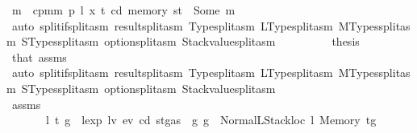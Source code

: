 \begin{isabellebody}
\ m\ \ {\isachardoublequoteopen}cpm{}m\ p\ l\ x\ t\ cd\ {\isacharparenleft}{\kern0pt}memory\ st{\isacharparenright}{\kern0pt}\ {\isacharequal}{\kern0pt}\ Some\ m{\isachardoublequoteclose}\isanewline
\ \ \ \ \ \ \ \ \isamarkupfalse%
\ {\isacharparenleft}{\kern0pt}auto\ split{\isacharcolon}{\kern0pt}if{\isacharunderscore}{\kern0pt}split{\isacharunderscore}{\kern0pt}asm\ result{\isachardot}{\kern0pt}split{\isacharunderscore}{\kern0pt}asm\ Type{\isachardot}{\kern0pt}split{\isacharunderscore}{\kern0pt}asm\ LType{\isachardot}{\kern0pt}split{\isacharunderscore}{\kern0pt}asm\ MTypes{\isachardot}{\kern0pt}split{\isacharunderscore}{\kern0pt}asm\ STypes{\isachardot}{\kern0pt}split{\isacharunderscore}{\kern0pt}asm\ option{\isachardot}{\kern0pt}split{\isacharunderscore}{\kern0pt}asm\ Stackvalue{\isachardot}{\kern0pt}split{\isacharunderscore}{\kern0pt}asm{\isacharparenright}{\kern0pt}\isanewline
\ \ \ \ \ \ \isamarkupfalse%
\ \isamarkupfalse%
\ {\isacharquery}{\kern0pt}thesis\ \isamarkupfalse%
\ that{\isacharparenleft}{\kern0pt}{}{\isacharparenright}{\kern0pt}\ assms\ {}\isanewline
\ \ \ \ \ \ \ \ \isamarkupfalse%
\ {\isacharparenleft}{\kern0pt}auto\ split{\isacharcolon}{\kern0pt}if{\isacharunderscore}{\kern0pt}split{\isacharunderscore}{\kern0pt}asm\ result{\isachardot}{\kern0pt}split{\isacharunderscore}{\kern0pt}asm\ Type{\isachardot}{\kern0pt}split{\isacharunderscore}{\kern0pt}asm\ LType{\isachardot}{\kern0pt}split{\isacharunderscore}{\kern0pt}asm\ MTypes{\isachardot}{\kern0pt}split{\isacharunderscore}{\kern0pt}asm\ STypes{\isachardot}{\kern0pt}split{\isacharunderscore}{\kern0pt}asm\ option{\isachardot}{\kern0pt}split{\isacharunderscore}{\kern0pt}asm\ Stackvalue{\isachardot}{\kern0pt}split{\isacharunderscore}{\kern0pt}asm{\isacharparenright}{\kern0pt}\isanewline
\ \ \ \ \isamarkupfalse%
\isanewline
\ \ \isamarkupfalse%
\isanewline
\ \ \ \ \isamarkupfalse%
\ {}\isanewline
\ \ \ \ \isamarkupfalse%
\ assms\ \isamarkupfalse%
\isanewline
\ \ \ \ \ \ {\isacharparenleft}{\kern0pt}{}{}{\isacharparenright}{\kern0pt}\ l\ t{\isacharprime}{\kern0pt}\ g{\isacharprime}{\kern0pt}\ \ {\isachardoublequoteopen}lexp\ lv\ ev\ cd\ {\isacharparenleft}{\kern0pt}st{\isasymlparr}gas\ {\isacharcolon}{\kern0pt}{\isacharequal}{\kern0pt}\ g{\isasymrparr}{\isacharparenright}{\kern0pt}\ g\ {\isacharequal}{\kern0pt}\ Normal{\isacharparenleft}{\kern0pt}{\isacharparenleft}{\kern0pt}LStackloc\ l{\isacharcomma}{\kern0pt}\ Memory\ t{\isacharprime}{\kern0pt}{\isacharparenright}{\kern0pt}{\isacharcomma}{\kern0pt}g{\isacharprime}{\kern0pt}{\isacharparenright}{\kern0pt}{\isachardoublequoteclose}\isanewline

\end{isabellebody}
